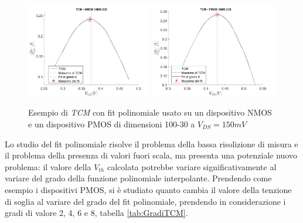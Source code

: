 \documentclass[12pt, letterpaper]{book}
\begin{document}
\begin{figure}[H]
  \centering
  \includegraphics[width=0.49\textwidth]{TCM-N4-100-30}
  \includegraphics[width=0.49\textwidth]{TCM-P1-100-30}
  \caption{Esempio di \emph{TCM} con fit polinomiale usato su un dispositivo NMOS e un dispositivo PMOS di dimensioni 100-30 a $V_{DS} = 150 mV$}
\end{figure}

Lo studio del fit polinomiale risolve il problema della bassa risolizione di misura e il problema della presenza di valori fuori scala, ma presenta una potenziale nuovo problema: il valore della $V_{th}$ calcolata potrebbe variare significativamente al variare del grado della funzione polinomiale interpolante.
Prendendo come esempio i dispositivi PMOS, si è studiato quanto cambia il valore della tenzione di soglia al variare del grado del fit polinomiale, prendendo in considerazione i gradi di valore 2, 4, 6 e 8, tabella \ref{tab:GradiTCM}.\\
\end{document}
